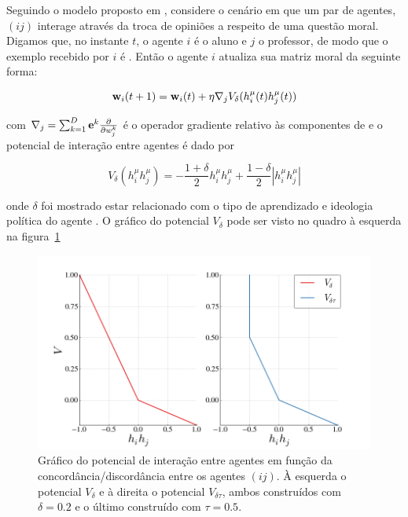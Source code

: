 \documentclass[11pt]{article}
\begin{document}
Seguindo o modelo proposto em \cite{visujeca}, considere o cenário em que
um par de agentes, $(ij)$ interage através da troca de opiniões a respeito de 
uma questão moral. Digamos que, no instante $t$, o agente $i$ é o aluno e $j$ o
professor, de modo que o exemplo recebido por $i$ é .
Então o agente $i$ atualiza sua matriz moral da seguinte forma:

\begin{equation*}
    \displaystyle \bold{w}_{i} (t+1)=\displaystyle \bold{w}_{i} (t)+\eta\bold{\nabla}_j V_{\delta}(h_i^{\mu}(t)h_j^{\mu}(t))
\end{equation*}

com $\bold{\nabla}_j = \sum_{k=1}^D \bold{e}^k\frac{\partial}{\partial w_j^k}$
é o operador gradiente relativo às componentes de  e o potencial de 
interação entre agentes é dado por

\begin{equation}
    V_{\delta}(h_i^{\mu}h_j^{\mu})=-\frac{1+\delta}{2}h_i^{\mu}h_j^{\mu}+
    \frac{1-\delta}{2}|h_i^{\mu}h_j^{\mu}|
\end{equation}

onde $\delta$ foi mostrado estar relacionado com o tipo de aprendizado e
ideologia política do agente \cite{Jonatas}. 
O gráfico do potencial $V_{\delta}$ pode ser visto no quadro à esquerda na
figura~\ref{figV}

\begin{figure}[h!]
  \centering
      \includegraphics[width=1.0\textwidth]{V.png}
  \caption{Gráfico do potencial de interação entre agentes em função da 
  concordância/discordância entre os agentes $(ij)$. À esquerda o potencial
  $V_{\delta}$ e à direita o potencial $V_{\delta \tau}$, ambos construídos
  com $\delta = 0.2$ e o último construído com $\tau = 0.5$.}
    \label{figV}
\end{figure}
\end{document}
